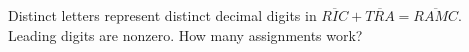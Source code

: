 Distinct letters represent distinct decimal digits in $\overline{RIC}+\overline{TRA}=\overline{RAMC}$. Leading digits are nonzero. How many assignments work?
